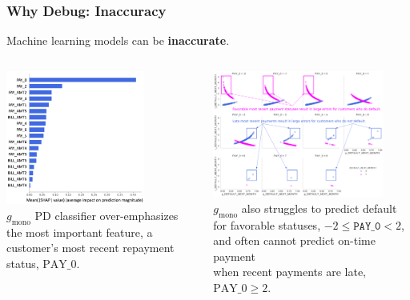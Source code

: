 \documentclass[11pt,
               aspectratio=169,
               hyperref={colorlinks}
               ]{beamer}
\begin{document}
			\begin{frame}
		
				\frametitle{Why Debug: Inaccuracy}
		
					\footnotesize{Machine learning models can be \textbf{inaccurate}.}
					\begin{columns}
				
						\centering
						\includegraphics[height=125pt]{../img/global_shap.png}\\
						\vspace{5pt}
						\tiny{$g_{\text{mono}}$ PD classifier over-emphasizes the most important feature, a customer's most recent repayment status, $\text{PAY\_0}$.}

						\vspace{11pt}
						\centering
						\includegraphics[height=118pt]{../img/lecture_5.png}\\
						\vspace{7pt}
						\tiny{$g_{\text{mono}}$ also struggles to predict default for favorable statuses, $-2  \leq \texttt{PAY\_0}  < 2$, and often cannot predict on-time payment\\when recent payments are late, $\text{PAY\_0} \geq 2$}.
				
					\end{columns}
					\normalsize
			
			\end{frame}
		
\end{document}
